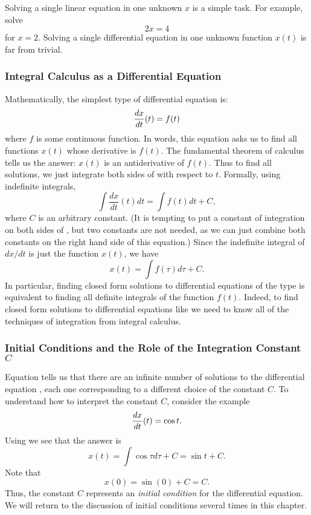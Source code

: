Solving a single linear equation in one unknown $x$ is a simple
task.  For example, solve
\[
2x = 4
\]
for $x=2$.  Solving a single differential equation in one unknown function
$x(t)$ is far from trivial.

\subsubsection*{Integral Calculus as a Differential Equation}

Mathematically, the simplest type of differential equation is:
\begin{equation} \label{e:intcalc}
\displaystyle\frac{dx}{dt}(t) = f(t)
\end{equation}
where $f$ is some continuous function.  In words, this equation asks us
to find all functions $x(t)$ whose derivative is $f(t)$.  The fundamental
theorem of calculus tells us the answer: $x(t)$ is an antiderivative of
$f(t)$.  Thus to find all solutions, we just integrate both sides of
 with respect to $t$.  Formally, using indefinite integrals, 
\begin{equation}  \label{E:integrate}
\int \frac{dx}{dt}(t)dt = \int f(t)dt + C,
\end{equation}
where $C$ is an arbitrary constant.  (It is tempting to put a constant of
integration on both sides of , but two constants are not 
needed, as we can just combine both constants on the right hand side of
this equation.)   Since the indefinite integral of $dx/dt$ is just the
function $x(t)$, we have 
\begin{equation}  \label{e:intcalcsoln}
x(t) = \int f(\tau) d\tau + C.
\end{equation}
In particular, finding closed form solutions to differential equations
of the type  is equivalent to finding all definite
integrals of the function $f(t)$.  Indeed, to find closed form solutions 
to differential equations like  we need to know all of the 
techniques of integration from integral calculus.

\subsubsection*{Initial Conditions and the Role of the Integration Constant 
$C$}

Equation  tells us that there are an infinite number of
solutions to the differential equation , each one
corresponding to a different choice of the constant $C$.  To understand how
to interpret the constant $C$, consider the example
\[
\displaystyle\frac{dx}{dt}(t) = \cos t.
\]
Using  we see that the answer is
\[
x(t) = \int \cos\tau d\tau  + C = \sin t + C.
\]
Note that 
\[
x(0) = \sin(0) + C = C.
\]
Thus, the constant $C$ represents an {\em initial condition\/} for the  
differential equation.  We will return to the discussion of initial 
conditions several times in this chapter.

